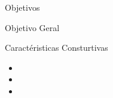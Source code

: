 \begin{frame}{Objetivos}
\begin{block}{Objetivo Geral}

\end{block}

\begin{block}{Caractéristicas Consturtivas}
\begin{itemize}
    \item 
    \item 
    \item 
\end{itemize}
\end{block}

    
\end{frame}